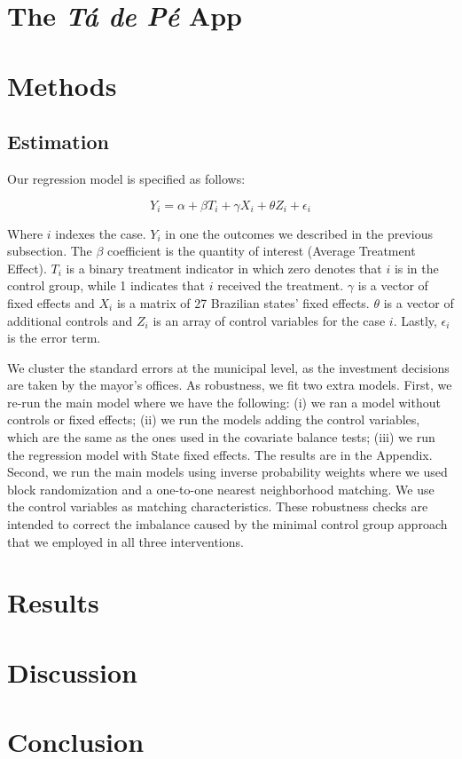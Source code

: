 \documentclass[12pt,a4paper,]{article}
\begin{document}
\hypertarget{the-ta-de-pe-app}{%
\section{\texorpdfstring{The \emph{Tá de Pé}
App}{The Tá de Pé App}}\label{the-ta-de-pe-app}}

\hypertarget{methods}{%
\section{Methods}\label{methods}}

\hypertarget{estimation}{%
\subsection{Estimation}\label{estimation}}

Our regression model is specified as follows:

\[Y_{i} = \alpha + \beta T_{i} + \gamma X_{i} + \theta Z_i + \epsilon_{i} \]

Where \(i\) indexes the case. \(Y_i\) in one the outcomes we described
in the previous subsection. The \(\beta\) coefficient is the quantity of
interest (Average Treatment Effect). \(T_i\) is a binary treatment
indicator in which zero denotes that \(i\) is in the control group,
while 1 indicates that \(i\) received the treatment. \(\gamma\) is a
vector of fixed effects and \(X_i\) is a matrix of 27 Brazilian states'
fixed effects. \(\theta\) is a vector of additional controls and \(Z_i\)
is an array of control variables for the case \(i\). Lastly,
\(\epsilon_i\) is the error term.

We cluster the standard errors at the municipal level, as the investment
decisions are taken by the mayor's offices. As robustness, we fit two
extra models. First, we re-run the main model where we have the
following: (i) we ran a model without controls or fixed effects; (ii) we
run the models adding the control variables, which are the same as the
ones used in the covariate balance tests; (iii) we run the regression
model with State fixed effects. The results are in the Appendix. Second,
we run the main models using inverse probability weights where we used
block randomization and a one-to-one nearest neighborhood matching. We
use the control variables as matching characteristics. These robustness
checks are intended to correct the imbalance caused by the minimal
control group approach that we employed in all three interventions.

\hypertarget{results}{%
\section{Results}\label{results}}

\hypertarget{discussion}{%
\section{Discussion}\label{discussion}}

\hypertarget{conclusion}{%
\section{Conclusion}\label{conclusion}}

\newpage
\setlength{\parindent}{0cm}
\setlength{\parskip}{5pt}


\end{document}
